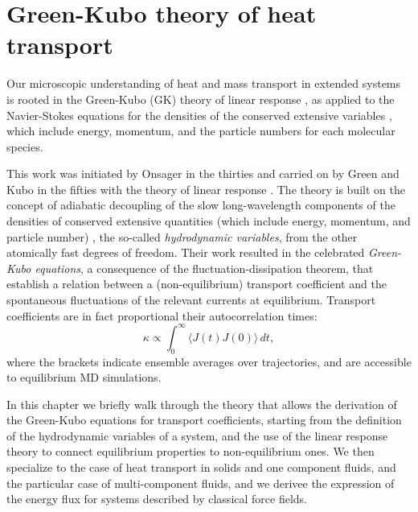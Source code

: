 \chapter{Green-Kubo theory of heat transport}  \label{ch:green-kubo}

Our microscopic understanding of heat and mass transport in extended systems is rooted in the Green-Kubo (GK) theory of linear response \cite{Green1954,Kubo1957a}, as applied to the Navier-Stokes equations for the densities of the conserved extensive variables \cite{Kadanoff1963,Forster1975}, which include energy, momentum, and the particle numbers for each molecular species. 
\begin{LEtext}

This work was initiated by Onsager in the thirties \cite{Onsager1931a,Onsager1931b} and carried on by Green and Kubo in the fifties with the theory of linear response \cite{Green1952,Green1954,Kubo1957a,Kubo1957b}. The theory is built on the concept of adiabatic decoupling of the slow long-wavelength components of the densities of conserved extensive quantities (which include energy, momentum, and particle number) \cite{Kadanoff1963}, the so-called \emph{hydrodynamic variables}, from the other atomically fast degrees of freedom. Their work resulted in the celebrated \emph{Green-Kubo equations}, a consequence of the fluctuation-dissipation theorem, that establish a relation between a (non-equilibrium) transport coefficient and the spontaneous fluctuations of the relevant currents at equilibrium. Transport coefficients are in fact proportional their autocorrelation times:
\begin{equation}
\kappa\propto\int_{0}^{\infty}\!\langle{J}(t){J}(0)\rangle\, dt, \label{eq:GK}
\end{equation}
where the brackets indicate ensemble averages over trajectories, and are accessible to equilibrium MD simulations.

In this chapter we briefly walk through the theory that allows the derivation of the Green-Kubo equations for transport coefficients, starting from the definition of the hydrodynamic variables of a system, and the use of the linear response theory to connect equilibrium properties to non-equilibrium ones. We then specialize to the case of heat transport in solids and one component fluids, and the particular case of multi-component fluids, and we derivee the expression of the energy flux for systems described by classical force fields.
\end{LEtext}


